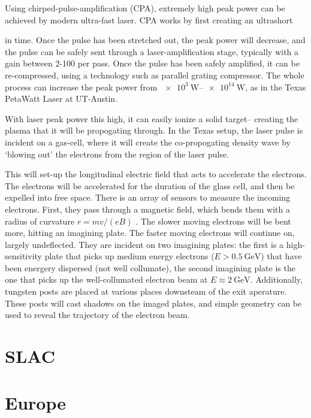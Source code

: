 \documentclass[12pt, titlepage]{caesar_book}
\begin{document}
Using chirped-pulse-amplification (CPA), extremely high peak power can be achieved by modern ultra-fast laser. CPA works by first creating an ultrashort

in time. Once the pulse has been stretched out, the peak power will decrease, and the pulse can be safely sent through a laser-amplification stage, typically with a gain between 2-100 per pass. Once the pulse has been safely amplified, it can be re-compressed, using a technology such as parallel grating compressor.
The whole process can increase the peak power from $\SIrange{e3}{e14}{\watt}$, as
in the Texas PetaWatt Laser at UT-Austin.

With laser peak power this high, it can easily ionize a solid target-- creating
the plasma that it will be propogating through. In the Texas setup, the laser pulse is incident on a gas-cell, where it will create the co-propogating density wave by `blowing out' the electrons from the region of the laser pulse.

This will set-up the longitudinal electric field that acts to accelerate the electrons. The electrons will be accelerated for the duration of the glass cell, and then be expelled into free space.  
There is an array of sensors to measure the incoming electrons. First, they pass
through a magnetic field, which bends them with a radius of curvature $ r = mv/(eB)$ . The slower moving electrons will be bent more, hitting an imagining plate. The faster moving electrons will continue on, largely undeflected. They are incident on two imagining plates: the first is a high-sensitivity plate that picks up medium energy electrons ($E >\SI{0.5}{\giga\electronvolt}$) that have been energery dispersed (not well collumate), the
second imagining plate is the one that picks up the well-collumated electron beam at $E \approx \SI{2}{\giga\electronvolt}$. Additionally, tungsten posts are placed at various places downsteam of the exit aperature. These posts will
cast shadows on the imaged plates, and simple geometry can be used to reveal
the trajectory of the electron beam.

\section{SLAC}

\section{Europe}
\end{document}
